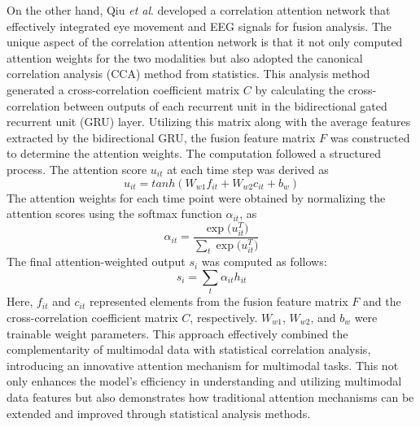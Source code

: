 \documentclass[preprint,12pt]{elsarticle}
\newcommand{\etal}{\textit{et al}. }
\begin{document}
On the other hand, Qiu \etal developed a correlation attention network that effectively integrated eye movement and EEG signals for fusion analysis. The unique aspect of the correlation attention network is that it not only computed attention weights for the two modalities but also adopted the canonical correlation analysis (CCA) method from statistics. This analysis method generated a cross-correlation coefficient matrix $C$ by calculating the cross-correlation between outputs of each recurrent unit in the bidirectional gated recurrent unit (GRU) layer. Utilizing this matrix along with the average features extracted by the bidirectional GRU, the fusion feature matrix $F$ was constructed to determine the attention weights. The computation followed a structured process. The attention score $u_{it}$ at each time step was derived as
\begin{equation}
     u_{it} = tanh(W_{w1}f_{it}+W_{w2}c_{it}+b_w)
\end{equation}
The attention weights for each time point were obtained by normalizing the attention scores using the softmax function $\alpha_{it}$, as
\begin{equation}
     \alpha_{it} = \frac{\exp{(u_{it}^T})}{\sum_{t} \exp{(u_{it}^T})}
\end{equation}
The final attention-weighted output $s_i$ was computed as follows:
\begin{equation}
     s_i = \sum_{t}\alpha_{it}h_{it}
\end{equation}
Here, $f_{it}$ and $c_{it}$ represented elements from the fusion feature matrix $F$ and the cross-correlation coefficient matrix $C$, respectively. $W_{w1}$, $W_{w2}$, and $b_w$ were trainable weight parameters. This approach effectively combined the complementarity of multimodal data with statistical correlation analysis, introducing an innovative attention mechanism for multimodal tasks. This not only enhances the model's efficiency in understanding and utilizing multimodal data features but also demonstrates how traditional attention mechanisms can be extended and improved through statistical analysis methods.
\end{document}
